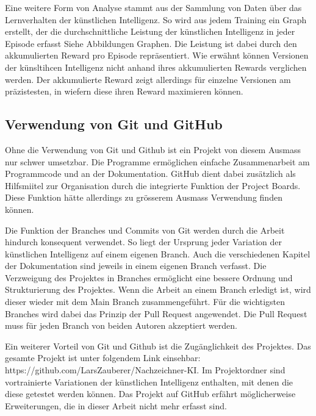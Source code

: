 Eine weitere Form von Analyse stammt aus der Sammlung von Daten über das
Lernverhalten der künstlichen Intelligenz. So wird aus jedem Training ein Graph
erstellt, der die durchschnittliche Leistung der künstlichen Intelligenz in
jeder Episode erfasst {Siehe Abbildungen Graphen}. Die Leistung ist dabei durch
den akkumulierten Reward pro Episode repräsentiert. Wie erwähnt können Versionen
der künsltihcen Intelligenz nicht anhand ihres akkumulierten Rewards verglichen
werden. Der akkumulierte Reward zeigt allerdings für einzelne Versionen am
präzistesten, in wiefern diese ihren Reward maximieren können.




\subsection{Verwendung von Git und GitHub}
\label{sub:d_reflex_git}
Ohne die Verwendung von Git und Github ist ein Projekt von diesem Ausmass nur
schwer umsetzbar. Die Programme ermöglichen einfache Zusammenarbeit am
Programmcode und an der Dokumentation. GitHub dient dabei zusätzlich als
Hilfsmiitel zur Organisation durch die integrierte Funktion der Project Boards.
Diese Funktion hätte allerdings zu grösserem Ausmass Verwendung finden können.

Die Funktion der Branches und Commits von Git werden durch die Arbeit hindurch
konsequent verwendet. So liegt der Ursprung jeder Variation der künstlichen
Intelligenz auf einem eigenen Branch. Auch die verschiedenen Kapitel der
Dokumentation sind jeweils in einem eigenen Branch verfasst. Die Verzweigung des
Projektes in Branches ermöglicht eine bessere Ordnung und Strukturierung des
Projektes. Wenn die Arbeit an einem Branch erledigt ist, wird dieser wieder mit
dem Main Branch zusammengeführt. Für die wichtigsten Branches wird dabei das
Prinzip der Pull Request angewendet. Die Pull Request muss für jeden Branch von
beiden Autoren akzeptiert werden.

Ein weiterer Vorteil von Git und Github ist die Zugänglichkeit des Projektes.
Das gesamte Projekt ist unter folgendem Link einsehbar:
https://github.com/LarsZauberer/Nachzeichner-KI. Im Projektordner sind
vortrainierte Variationen der künstlichen Intelligenz enthalten, mit denen die
diese getestet werden können. Das Projekt auf GitHub erfährt möglicherweise
Erweiterungen, die in dieser Arbeit nicht mehr erfasst sind.






